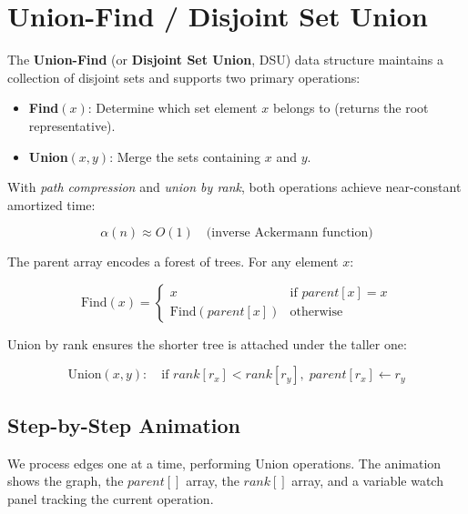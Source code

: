\section{Union-Find / Disjoint Set Union}

The \textbf{Union-Find} (or \textbf{Disjoint Set Union}, DSU) data structure maintains a collection
of disjoint sets and supports two primary operations:

\begin{itemize}
\item \textbf{Find}$(x)$: Determine which set element $x$ belongs to (returns the root representative).
\item \textbf{Union}$(x, y)$: Merge the sets containing $x$ and $y$.
\end{itemize}

With \textit{path compression} and \textit{union by rank}, both operations achieve near-constant
amortized time:

$$\alpha(n) \approx O(1) \quad \text{(inverse Ackermann function)}$$

The parent array encodes a forest of trees. For any element $x$:

$$\text{Find}(x) = \begin{cases} x & \text{if } parent[x] = x \\ \text{Find}(parent[x]) & \text{otherwise} \end{cases}$$

Union by rank ensures the shorter tree is attached under the taller one:

$$\text{Union}(x, y): \quad \text{if } rank[r_x] < rank[r_y], \; parent[r_x] \leftarrow r_y$$

\begin{diagram}[id="uf-initial-graph", label="Initial graph with 8 nodes"]
\end{diagram}

\subsection{Step-by-Step Animation}

We process edges one at a time, performing Union operations. The animation shows
the graph, the $parent[]$ array, the $rank[]$ array, and a variable watch panel
tracking the current operation.

